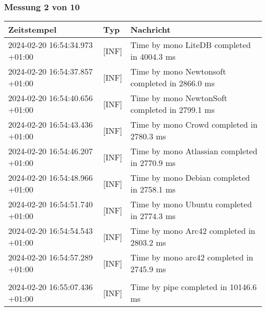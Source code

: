     \subsubsection*{Messung 2 von 10} \label{subsubsec:LiteDbWenigerPaketeAlsDb2von10}
        {
            {\small
                \begin{tabularx}{\textwidth}{|l|l|X|}
                    \hline
                    \textbf{Zeitstempel} & \textbf{Typ} & \textbf{Nachricht} \\
                    \hline
                    \endhead
                    2024-02-20 16:54:34.973 +01:00 & [INF] & Time by mono LiteDB completed in 4004.3 ms \\
                    2024-02-20 16:54:37.857 +01:00 & [INF] & Time by mono Newtonsoft completed in 2866.0 ms \\
                    2024-02-20 16:54:40.656 +01:00 & [INF] & Time by mono NewtonSoft completed in 2799.1 ms \\
                    2024-02-20 16:54:43.436 +01:00 & [INF] & Time by mono Crowd completed in 2780.3 ms \\
                    2024-02-20 16:54:46.207 +01:00 & [INF] & Time by mono Atlassian completed in 2770.9 ms \\
                    2024-02-20 16:54:48.966 +01:00 & [INF] & Time by mono Debian completed in 2758.1 ms \\
                    2024-02-20 16:54:51.740 +01:00 & [INF] & Time by mono Ubuntu completed in 2774.3 ms \\
                    2024-02-20 16:54:54.543 +01:00 & [INF] & Time by mono Arc42 completed in 2803.2 ms \\
                    2024-02-20 16:54:57.289 +01:00 & [INF] & Time by mono arc42 completed in 2745.9 ms \\
                    & & \\
                    2024-02-20 16:55:07.436 +01:00 & [INF] & Time by pipe completed in 10146.6 ms \\
                    \hline
                \end{tabularx}
            }
        }

